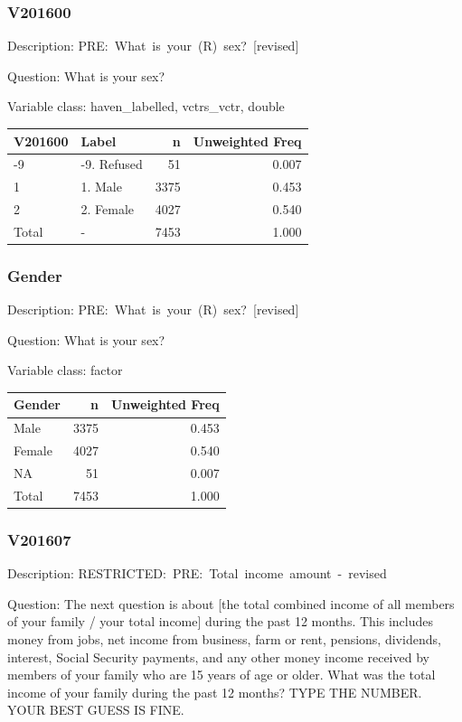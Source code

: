 \documentclass[
]{krantz}
\begin{document}
\hypertarget{v201600}{%
\subsubsection*{V201600}\label{v201600}}


Description: PRE:~What~is~your~(R)~sex?~{[}revised{]}

Question: What is your sex?

Variable class: haven\_labelled, vctrs\_vctr, double

\begin{tabular}[t]{l|l|r|r}
\hline
V201600 & Label & n & Unweighted Freq\\
\hline
-9 & -9. Refused & 51 & 0.007\\
\hline
1 & 1. Male & 3375 & 0.453\\
\hline
2 & 2. Female & 4027 & 0.540\\
\hline
Total & - & 7453 & 1.000\\
\hline
\end{tabular}

\hypertarget{gender}{%
\subsubsection*{Gender}\label{gender}}


Description: PRE:~What~is~your~(R)~sex?~{[}revised{]}

Question: What is your sex?

Variable class: factor

\begin{tabular}[t]{l|r|r}
\hline
Gender & n & Unweighted Freq\\
\hline
Male & 3375 & 0.453\\
\hline
Female & 4027 & 0.540\\
\hline
NA & 51 & 0.007\\
\hline
Total & 7453 & 1.000\\
\hline
\end{tabular}

\hypertarget{v201607}{%
\subsubsection*{V201607}\label{v201607}}


Description: RESTRICTED:~PRE:~Total~income~amount~-~revised

Question: The next question is about {[}the total combined income of all members of your family / your total income{]} during the past 12 months. This includes money from jobs, net income from business, farm or rent, pensions, dividends, interest, Social Security payments, and any other money income received by members of your family who are 15 years of age or older. What was the total income of your family during the past 12 months? TYPE THE NUMBER. YOUR BEST GUESS IS FINE.
\end{document}
